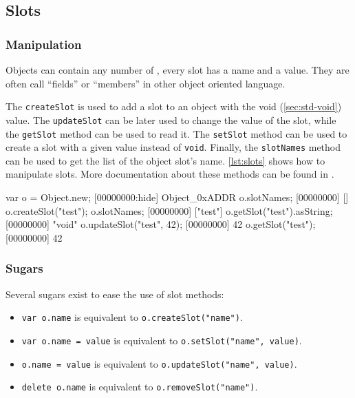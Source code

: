 \subsection{Slots}

\subsubsection{Manipulation}

Objects can contain any number of , every slot has a name and a
value. They are often call ``fields'' or ``members'' in other object
oriented language.

The \lstinline|createSlot| is used to add a slot to an object with the
void (\autoref{sec:std-void}) value. The \lstinline|updateSlot| can be later
used to change the value of the slot, while the \lstinline|getSlot|
method can be used to read it. The \lstinline|setSlot| method can be
used to create a slot with a given value instead of
\lstinline|void|. Finally, the
\lstinline|slotNames| method can be used to get the list of the object
slot's name. \autoref{lst:slots} shows how to manipulate slots. More
documentation about these methods can be found in .

\begin{urbiscript}[caption=Manipulating slots, label=lst:slots,
  float=\floatpos]
var o = Object.new;
[00000000:hide] Object_0xADDR
o.slotNames;
[00000000] []
o.createSlot("test");
o.slotNames;
[00000000] ["test"]
o.getSlot("test").asString;
[00000000] "void"
o.updateSlot("test", 42);
[00000000] 42
o.getSlot("test");
[00000000] 42
\end{urbiscript}

\subsubsection{Sugars}

Several sugars exist to ease the use of slot methods:

\begin{itemize}
\item \lstinline|var o.name| is equivalent to
  \lstinline|o.createSlot("name")|.
\item \lstinline|var o.name = value| is equivalent to
  \lstinline|o.setSlot("name", value)|.
\item \lstinline|o.name = value| is equivalent to
  \lstinline|o.updateSlot("name", value)|.
\item \lstinline|delete o.name| is equivalent to
  \lstinline|o.removeSlot("name")|.
\end{itemize}


